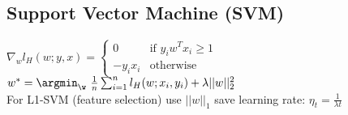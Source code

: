 \subsection*{Support Vector Machine (SVM)}
$\nabla_w l_H(w;y,x) = 
\begin{cases}
    0 &\text{if } y_i w^T x_i \geq 1\\
    -y_i x_i &\text{otherwise}
\end{cases}$\\
$w^* = \argmin_\w ~\frac{1}{n}\sum_{i=1}^nl_H(w;x_i,y_i)+\lambda||w||_2^2$\\ For L1-SVM (feature selection) use $||w||_1$ 
save learning rate: $\eta_t=\frac{1}{\lambda t}$

